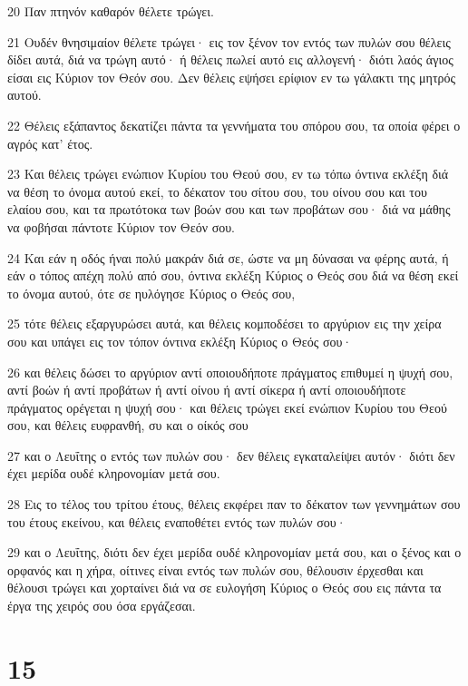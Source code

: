 \par 20 Παν πτηνόν καθαρόν θέλετε τρώγει.
\par 21 Ουδέν θνησιμαίον θέλετε τρώγει· εις τον ξένον τον εντός των πυλών σου θέλεις δίδει αυτά, διά να τρώγη αυτό· ή θέλεις πωλεί αυτό εις αλλογενή· διότι λαός άγιος είσαι εις Κύριον τον Θεόν σου. Δεν θέλεις εψήσει ερίφιον εν τω γάλακτι της μητρός αυτού.
\par 22 Θέλεις εξάπαντος δεκατίζει πάντα τα γεννήματα του σπόρου σου, τα οποία φέρει ο αγρός κατ' έτος.
\par 23 Και θέλεις τρώγει ενώπιον Κυρίου του Θεού σου, εν τω τόπω όντινα εκλέξη διά να θέση το όνομα αυτού εκεί, το δέκατον του σίτου σου, του οίνου σου και του ελαίου σου, και τα πρωτότοκα των βοών σου και των προβάτων σου· διά να μάθης να φοβήσαι πάντοτε Κύριον τον Θεόν σου.
\par 24 Και εάν η οδός ήναι πολύ μακράν διά σε, ώστε να μη δύνασαι να φέρης αυτά, ή εάν ο τόπος απέχη πολύ από σου, όντινα εκλέξη Κύριος ο Θεός σου διά να θέση εκεί το όνομα αυτού, ότε σε ηυλόγησε Κύριος ο Θεός σου,
\par 25 τότε θέλεις εξαργυρώσει αυτά, και θέλεις κομποδέσει το αργύριον εις την χείρα σου και υπάγει εις τον τόπον όντινα εκλέξη Κύριος ο Θεός σου·
\par 26 και θέλεις δώσει το αργύριον αντί οποιουδήποτε πράγματος επιθυμεί η ψυχή σου, αντί βοών ή αντί προβάτων ή αντί οίνου ή αντί σίκερα ή αντί οποιουδήποτε πράγματος ορέγεται η ψυχή σου· και θέλεις τρώγει εκεί ενώπιον Κυρίου του Θεού σου, και θέλεις ευφρανθή, συ και ο οίκός σου
\par 27 και ο Λευΐτης ο εντός των πυλών σου· δεν θέλεις εγκαταλείψει αυτόν· διότι δεν έχει μερίδα ουδέ κληρονομίαν μετά σου.
\par 28 Εις το τέλος του τρίτου έτους, θέλεις εκφέρει παν το δέκατον των γεννημάτων σου του έτους εκείνου, και θέλεις εναποθέτει εντός των πυλών σου·
\par 29 και ο Λευΐτης, διότι δεν έχει μερίδα ουδέ κληρονομίαν μετά σου, και ο ξένος και ο ορφανός και η χήρα, οίτινες είναι εντός των πυλών σου, θέλουσιν έρχεσθαι και θέλουσι τρώγει και χορταίνει διά να σε ευλογήση Κύριος ο Θεός σου εις πάντα τα έργα της χειρός σου όσα εργάζεσαι.

\chapter{15}

